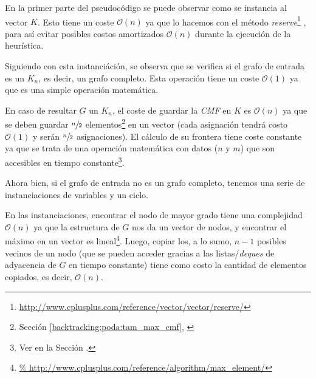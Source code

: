 \bigskip

\par En la primer parte del pseudoc\'odigo se puede observar como se instancia
    al vector $K$. Esto tiene un coste $\mathcal O(n)$ ya que lo hacemos con
    el m\'etodo \emph{reserve}\footnote{\url{http://www.cplusplus.com/reference/vector/vector/reserve/}}%
    , para as\'i evitar posibles costos amortizados $\mathcal O(n)$ durante
    la ejecuci\'on de la heur\'istica.

\par Siguiendo con esta instanci\'aci\'on, se observa que se verifica si el
    grafo de entrada es un $K_n$, es decir, un grafo completo. Esta operaci\'on
    tiene un coste $\mathcal O(1)$ ya que es una simple operaci\'on matem\'atica.

\par En caso de resultar $G$ un $K_n$, el coste de guardar la \emph{CMF} en $K$ es
    $\mathcal O(n)$ ya que se deben guardar $\sfrac{n}{2}$ elementos\footnote{Secci\'on
    \ref{backtracking:poda:tam_max_cmf}, \emph{}}
    en un vector (cada asignaci\'on tendr\'a costo $\mathcal O(1)$ y ser\'an
    $\sfrac{n}{2}$ asignaciones). El c\'alculo de su frontera tiene coste
    constante ya que se trata de una operaci\'on matem\'atica con datos ($n$ y $m$)
    que son accesibles en tiempo constante\footnote{Ver \emph{}
    en la Secci\'on \emph{}.}.

\par Ahora bien, si el grafo de entrada no es un grafo completo, tenemos una serie
    de instanciaciones de variables y un ciclo.

\par En las instanciaciones, encontrar el nodo de mayor grado tiene una complejidad
    $\mathcal O(n)$ ya que la estructura de $G$ nos da un vector de nodos,
    y encontrar el m\'aximo en un vector es lineal\footnote{\url{%
    http://www.cplusplus.com/reference/algorithm/max_element/}}. Luego, copiar
    los, a lo sumo, $n-1$ posibles vecinos de un nodo (que se pueden acceder gracias a las
    listas/\emph{deques} de adyacencia de $G$ en tiempo constante) tiene como costo
    la cantidad de elementos copiados, es decir, $\mathcal O(n)$.

